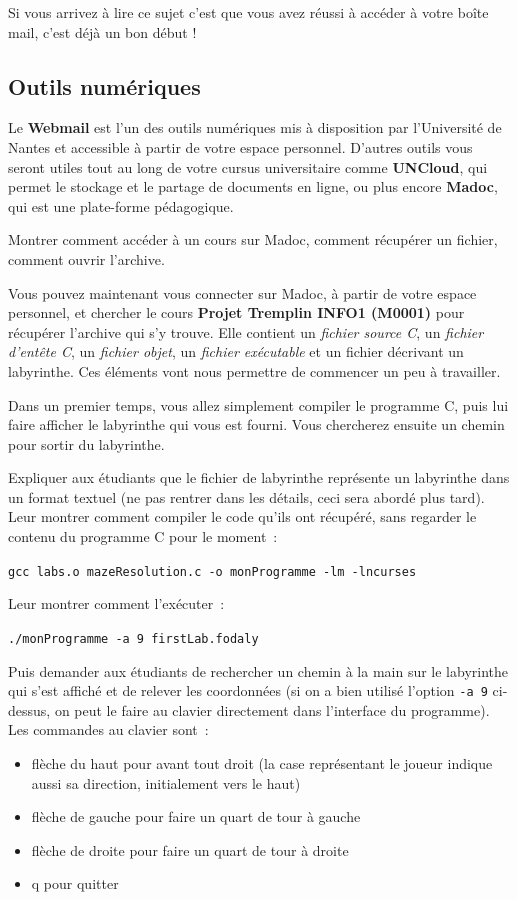 \documentclass[a4paper]{article}
\newenvironment{enseignants}[1]{\noindent\color{blue}{\bf #1}}{}
\begin{document}
Si vous arrivez à lire ce sujet c’est que vous avez réussi à accéder à votre boîte mail, c’est déjà un bon début !

\subsection{Outils numériques}

Le \textbf{Webmail} est l’un des outils numériques mis à disposition par l’Université de Nantes et accessible à partir de votre espace personnel. D’autres outils vous seront utiles tout au long de votre cursus universitaire comme \textbf{UNCloud}, qui permet le stockage et le partage de documents en ligne, ou plus encore \textbf{Madoc}, qui est une plate-forme pédagogique.

\begin{enseignants}{Madoc~:}
  Montrer comment accéder à un cours sur Madoc, comment récupérer un fichier, comment ouvrir l'archive.
\end{enseignants}

Vous pouvez maintenant vous connecter sur Madoc, à partir de votre espace personnel, et chercher le cours \textbf{Projet Tremplin INFO1 (M0001)} pour récupérer l'archive qui s'y trouve. Elle contient un \emph{fichier source C}, un \emph{fichier d'entête C}, un \emph{fichier objet}, un \emph{fichier exécutable} et un fichier décrivant un labyrinthe. Ces éléments vont nous permettre de commencer un peu à travailler.

Dans un premier temps, vous allez simplement compiler le programme C, puis lui faire afficher le labyrinthe qui vous est fourni.
Vous chercherez ensuite un chemin pour sortir du labyrinthe.

\begin{enseignants}{}
  Expliquer aux étudiants que le fichier de labyrinthe représente un labyrinthe dans un format textuel (ne pas rentrer dans les détails, ceci sera abordé plus tard).
  Leur montrer comment compiler le code qu'ils ont récupéré, sans regarder le contenu du programme C pour le moment~:

  \verb|gcc labs.o mazeResolution.c -o monProgramme -lm -lncurses|

  Leur montrer comment l'exécuter~:

  \verb|./monProgramme -a 9 firstLab.fodaly|

  Puis demander aux étudiants de rechercher un chemin à la main sur le labyrinthe qui s'est affiché et de relever les coordonnées (si on a bien utilisé l'option \verb|-a 9| ci-dessus, on peut le faire au clavier directement dans l'interface du programme).
  Les commandes au clavier sont :
  \begin{itemize}
    \item flèche du haut pour avant tout droit (la case représentant le joueur indique aussi sa direction, initialement vers le haut)
    \item flèche de gauche pour faire un quart de tour à gauche
    \item flèche de droite pour faire un quart de tour à droite
    \item q pour quitter
  \end{itemize}
\end{enseignants}
\end{document}
